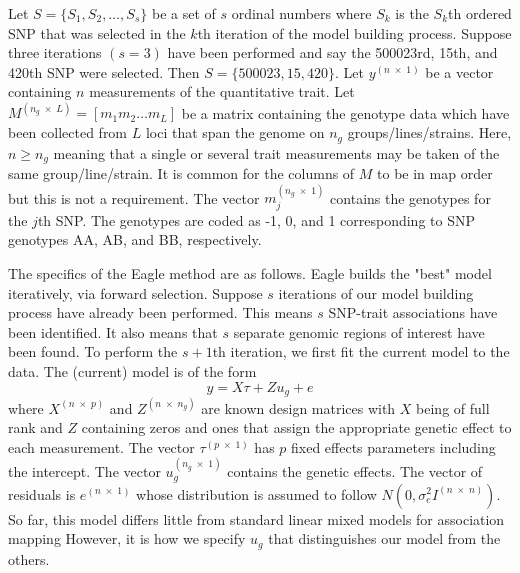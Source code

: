 \documentclass{article}
\begin{document}
Let $S = \{ S_1, S_2, \ldots, S_s\}$ be a set of $s$ ordinal numbers where $S_k$ is the $S_k$th ordered SNP that was 
selected in the $k$th iteration of the model building process. Suppose three iterations  $(s=3)$
have been performed and say the 500023rd, 15th, and 420th
SNP were selected. Then $S=\{500023, 15, 420\}$. 
Let $y^{(n \; \times \;1)}$ be a vector containing $n$ measurements of the quantitative trait. 
Let $M^{(n_g \; \times \; L)} = [m_1 m_2 \ldots m_L]$ be a matrix containing the genotype data which have been collected 
from $L$ loci that span the genome on $n_g$ groups/lines/strains.  Here, $n \geq n_g$ meaning that a single or several trait measurements 
may be taken of the same group/line/strain. 
 It is common for the columns of $M$ to be in map order but this is not a requirement. 
The vector $m_j^{(n_g \; \times \; 1)}$ contains the genotypes for the $j$th SNP. 
The genotypes are coded as -1, 0, and 1 corresponding to SNP genotypes AA, AB, and BB, respectively. 

The specifics of the Eagle method are as follows. 
Eagle builds the "best" model iteratively, via forward selection. 
Suppose $s$ iterations of our model building process have already been performed. This means $s$ SNP-trait 
associations have been identified.  It also means that $s$ separate genomic regions of interest have been found.  
To perform the $s+1$th  iteration, we first fit the current model to the data. 
The (current) model is of the form 
\begin{equation}
\label{eq1}
y = X \tau + Z u_g + e
\end{equation}
where 
$X^{(n \; \times \; p)}$ and $Z^{( n \; \times \; n_g)}$ are known design matrices with $X$ being of full rank and $Z$ 
containing zeros and ones that assign the appropriate genetic effect to each measurement. 
The vector 
$\tau^{(p \; \times \; 1)}$ has $p$ fixed effects parameters including the intercept. The vector 
$u_g^{(n_g \; \times \; 1)}$ contains the 
genetic effects. The vector of residuals is 
$e^{(n \; \times \;1)}$ whose distribution is assumed to follow $N(0, \sigma^2_e I^{(n \; \times \; n)})$. 
So far,  this model differs little from standard linear mixed models for association mapping \cite{yu2006unified,zhao2007arabidopsis} 
However, 
it is how we specify $u_g$ that distinguishes our model from the others. 
\end{document}
